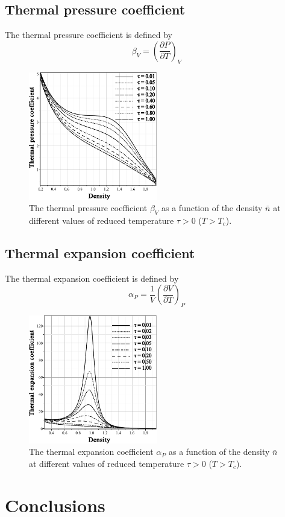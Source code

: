 \documentclass[12pt]{article}
\begin{document}
	\subsection{Thermal pressure coefficient}
	The thermal pressure coefficient is defined by
	\begin{equation}
		\label{def:therm_pres_coef}
		\beta_V = \left( \frac{\partial P}{\partial T} \right)_V
	\end{equation}
	
	\begin{figure}[h!]
		\centering \includegraphics[width=0.5\textwidth]{f3.pdf}
		\vskip-3mm\caption{The thermal pressure coefficient $\beta_V$ as a function of the density $\bar n$ at different values of reduced temperature $\tau > 0$ ($T > T_c$). 
		}\label{fig3}
	\end{figure}
	
	\subsection{Thermal expansion coefficient}
	The thermal expansion coefficient is defined by
	\begin{equation}
		\alpha_P = \frac{1}{V}\left(\frac{\partial V}{\partial T}\right)_P
	\end{equation}
	
	\begin{figure}[h!]
		\centering \includegraphics[width=0.5\textwidth]{f4.pdf}
		\vskip-3mm\caption{The thermal expansion coefficient $\alpha_P$ as a function of the density $\bar n$ at different values of reduced temperature $\tau > 0$ ($T > T_c$). 
		}\label{fig4}
	\end{figure}
	
	\section{Conclusions}
	
	
\end{document}
